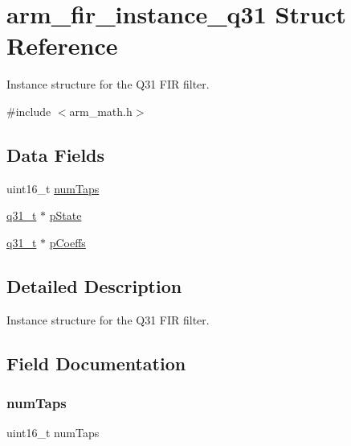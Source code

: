 \hypertarget{structarm__fir__instance__q31}{}\section{arm\+\_\+fir\+\_\+instance\+\_\+q31 Struct Reference}
\label{structarm__fir__instance__q31}


Instance structure for the Q31 F\+IR filter.  




{\ttfamily \#include $<$arm\+\_\+math.\+h$>$}

\subsection*{Data Fields}
\begin{DoxyCompactItemize}
\item 
uint16\+\_\+t \mbox{\hyperlink{structarm__fir__instance__q31_a751941891e47f522a7f5375fe8990aac}{num\+Taps}}
\item 
\mbox{\hyperlink{arm__math_8h_adc89a3547f5324b7b3b95adec3806bc0}{q31\+\_\+t}} $\ast$ \mbox{\hyperlink{structarm__fir__instance__q31_adee4ba3ee8869865af7d8fa08ca913d6}{p\+State}}
\item 
\mbox{\hyperlink{arm__math_8h_adc89a3547f5324b7b3b95adec3806bc0}{q31\+\_\+t}} $\ast$ \mbox{\hyperlink{structarm__fir__instance__q31_a68888e36167d81cb7836db10367a1682}{p\+Coeffs}}
\end{DoxyCompactItemize}


\subsection{Detailed Description}
Instance structure for the Q31 F\+IR filter. 

\subsection{Field Documentation}
\mbox{\label{structarm__fir__instance__q31_a751941891e47f522a7f5375fe8990aac}} 
\subsubsection{\texorpdfstring{num\+Taps}{numTaps}}
{\footnotesize\ttfamily uint16\+\_\+t num\+Taps}

